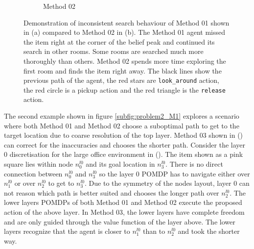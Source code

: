 \begin{figure}
\begin{subfigure}[b]{0.49\textwidth}
        \caption{Method 02}
        \label{subfig:problem1_M2}
    \end{subfigure}
    \caption{Demonstration of inconsistent search behaviour of Method 01 shown in (a) compared to Method 02 in (b). The Method 01 agent missed the item right at the corner of the belief peak and continued its search in other rooms. Some rooms are searched much more thoroughly than others. Method 02 spends more time exploring the first room and finds the item right away. The black lines show the previous path of the agent, the red stars are \texttt{look\_around} action, the red circle is a pickup action and the red triangle is the \texttt{release} action.}
    \label{fig:M1_prob01}
\end{figure}

The second example shown in figure \ref{subfig:problem2_M1} explores a scenario where both Method 01 and Method 02 choose a suboptimal path to get to the target location due to coarse resolution of the top layer. Method 03 shown in () can correct for the inaccuracies and chooses the shorter path. Consider the layer 0 discretisation for the large office environment in (). The item shown as a pink square lies within node $n_0^{l0}$ and its goal location in $n_3^{l0}$. There is no direct connection between $n_0^{l0}$ and $n_3^{l0}$ so the layer 0 POMDP has to navigate either over $n_1^{l0}$ or over $n_2^{l0}$ to get to $n_3^{l0}$. Due to the symmetry of the nodes layout, layer 0 can not reason which path is better suited and chooses the longer path over $n_2^{l0}$. The lower layers POMDPs of both Method 01 and Method 02 execute the proposed action of the above layer. In Method 03, the lower layers have complete freedom and are only guided through the value function of the layer above. The lower layers recognize that the agent is closer to $n_1^{l0}$ than to $n_2^{l0}$ and took the shorter way.

